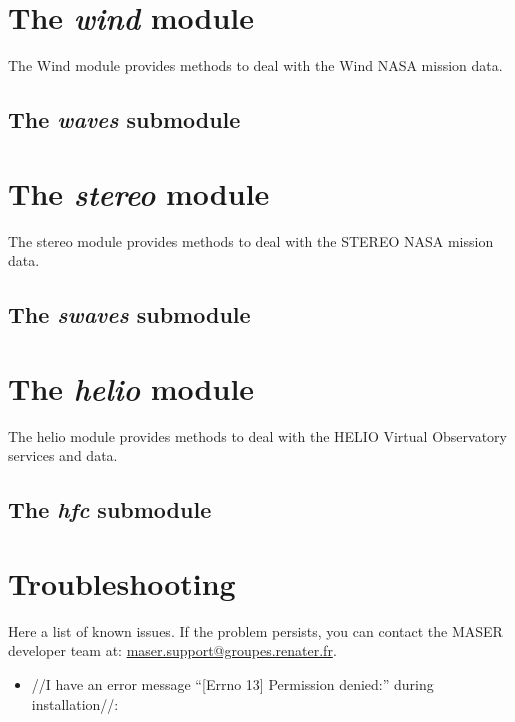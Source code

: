 \documentclass[letterpaper,10pt,english]{sphinxmanual}
\begin{document}
\chapter{The \emph{wind} module}
\label{wind::doc}\label{wind:the-wind-module}
The Wind module provides methods to deal with the Wind NASA mission data.


\section{The \emph{waves} submodule}
\label{wind:the-waves-submodule}

\chapter{The \emph{stereo} module}
\label{stereo::doc}\label{stereo:the-stereo-module}
The stereo module provides methods to deal with the STEREO NASA mission data.


\section{The \emph{swaves} submodule}
\label{stereo:the-swaves-submodule}

\chapter{The \emph{helio} module}
\label{helio::doc}\label{helio:the-helio-module}
The helio module provides methods to deal with the HELIO Virtual Observatory services and data.


\section{The \emph{hfc} submodule}
\label{helio:the-hfc-submodule}

\chapter{Troubleshooting}
\label{appendices::doc}\label{appendices:troubleshooting}
Here a list of known issues.
If the problem persists, you can contact the MASER developer team at: \href{mailto:maser.support@groupes.renater.fr}{maser.support@groupes.renater.fr}.
\begin{itemize}
\item {} 
//I have an error message ``{[}Errno 13{]} Permission denied:'' during installation//:

\end{itemize}
\end{document}
